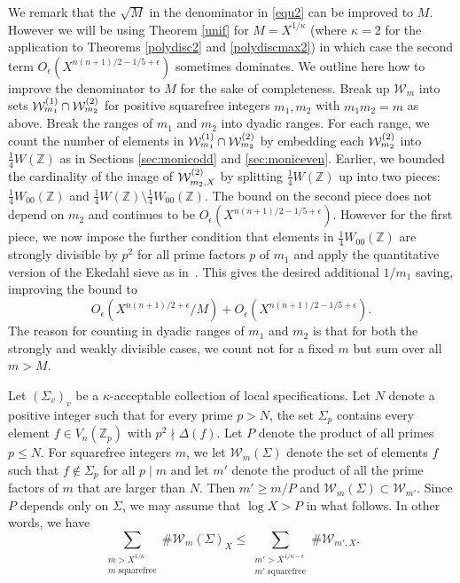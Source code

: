 \documentclass[11pt]{article}
\def\Z{{\mathbb Z}}
\def\s{{\rm stab.}}
\def\U{{\mathcal W}}
\def\W{{\mathcal W}}
\def\Vmn{{V_n}}
\def\Z{{\mathbb Z}}
\def\w{{\rm {(2)}}}
\def\s{{\rm {(1)}}}
\begin{document}
We remark that the $\sqrt{M}$ in the denominator in \eqref{equ2} can
be improved to $M$. However we will be using Theorem \ref{unif} for
$M=X^{1/\kappa}$ (where $\kappa=2$ for the application to Theorems
\ref{polydisc2} and \ref{polydiscmax2}) in which case the second term
$O_\epsilon(X^{n(n+1)/2-1/5+\epsilon})$ sometimes dominates. We
outline here how to improve the denominator to $M$ for the sake of
completeness. Break up $\U_m$ into sets $\U_{m_1}^\s\cap\U_{m_2}^\w$
for positive squarefree integers $m_1,m_2$ with $m_1m_2=m$ as
above. Break the ranges of $m_1$ and $m_2$ into dyadic ranges. For
each range, we count the number of elements in
$\U_{m_1}^\s\cap\U_{m_2}^\w$ by embedding each $\U_{m_2}^\w$ into
$\frac14W(\Z)$ as in Sections \ref{sec:monicodd} and
\ref{sec:moniceven}. Earlier, we bounded the cardinality of the image
of $\U_{m_2,X}^\w$ by splitting $\frac14W(\Z)$ up into two pieces:
$\frac14W_{00}(\Z)$ and $\frac14W(\Z)\setminus\frac14W_{00}(\Z)$. The
bound on the second piece does not depend on $m_2$ and continues to be
$O_\epsilon(X^{n(n+1)/2-1/5+\epsilon})$. However for the first piece,
we now impose the further condition that elements in $\frac14
W_{00}(\Z)$ are strongly divisible by $p^2$ for all prime factors $p$
of $m_1$ and apply the quantitative version of the Ekedahl sieve as
in~\cite{geosieve}. This gives the desired additional $1/m_1$ saving,
improving the bound to
\begin{equation*}
O_\epsilon(X^{n(n+1)/2+\epsilon}/M)+O_\epsilon(X^{n(n+1)/2-1/5+\epsilon}).
\end{equation*}
The reason for counting in dyadic ranges of $m_1$ and $m_2$ is
that for both the strongly and weakly divisible cases, we count
not for a fixed $m$ but sum over all $m>M$.


\vspace{10pt}

Let $(\Sigma_v)_v$ be a $\kappa$-acceptable collection of local
specifications. Let $N$ denote a positive integer such that for every
prime $p>N$, the set $\Sigma_p$ contains every element $f\in
\Vmn(\Z_p)$ with $p^2\nmid \Delta(f)$. Let $P$ denote the product of
all primes $p\leq N$. For squarefree integers $m$, we let
$\W_m(\Sigma)$ denote the set of elements $f$ such that
$f\not\in\Sigma_p$ for all $p\mid m$ and let $m'$ denote the product
of all the prime factors of $m$ that are larger than $N$. Then $m'\geq
m/P$ and $\W_m(\Sigma)\subset \W_{m'}.$ Since $P$ depends only on
$\Sigma$, we may assume that $\log X > P$ in what follows. In other
words, we have
\begin{equation}\label{eq:haha}
\sum_{\substack{m>X^{1/\kappa}\\ m\;\mathrm{ squarefree}}}\#\W_{m}(\Sigma)_X \leq \sum_{\substack{m'>X^{1/\kappa-\epsilon}\\ m'\;\mathrm{ squarefree}}}\#\W_{m',X}.
\end{equation}
\end{document}
